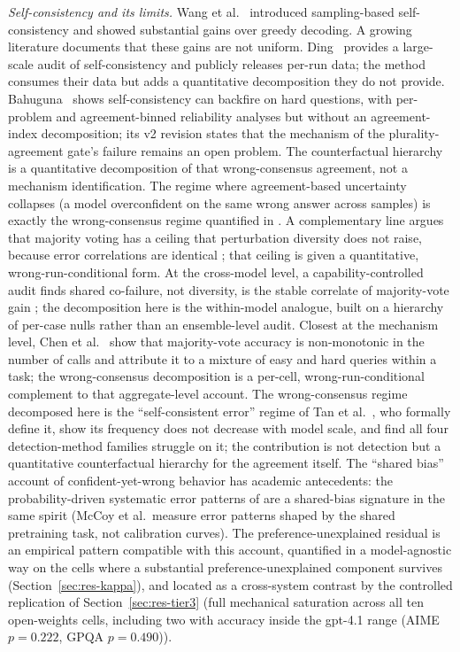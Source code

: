 \documentclass{article}
\begin{document}
\emph{Self-consistency and its limits.}
Wang et al.~\cite{wang2022selfconsistency} introduced sampling-based
self-consistency and showed substantial gains over greedy decoding. A
growing literature documents that these gains are not uniform.
Ding~\cite{ding2026auditing} provides a large-scale audit of self-consistency and publicly releases per-run data; the method consumes their data but adds a quantitative decomposition they do not provide.
Bahuguna~\cite{bahuguna2026when} shows self-consistency can
backfire on hard questions, with per-problem and agreement-binned
reliability analyses but without an agreement-index decomposition; its v2 revision states that the mechanism of the plurality-agreement gate's failure remains an open problem. The counterfactual hierarchy is a quantitative decomposition of that wrong-consensus agreement, not a mechanism identification. The regime where agreement-based uncertainty collapses (a model overconfident on the same wrong answer across samples) is exactly the wrong-consensus regime quantified in \cite{hamidieh2026}. A complementary line argues that majority voting has a ceiling that perturbation diversity does not raise, because error correlations are identical \cite{fadnavis2026}; that ceiling is given a quantitative, wrong-run-conditional form. At the cross-model level, a capability-controlled audit finds shared co-failure, not diversity, is the stable correlate of majority-vote gain \cite{kim2026}; the decomposition here is the within-model analogue, built on a hierarchy of per-case nulls rather than an ensemble-level audit. Closest at the mechanism level, Chen et al.~\cite{chen2024} show that majority-vote accuracy is non-monotonic in the number of calls and attribute it to a mixture of easy and hard queries within a task; the wrong-consensus decomposition is a per-cell, wrong-run-conditional complement to that aggregate-level account. The wrong-consensus regime decomposed here is the ``self-consistent error'' regime of Tan et al.~\cite{tan2025}, who formally define it, show its frequency does not decrease with model scale, and find all four detection-method families struggle on it; the contribution is not detection but a quantitative counterfactual hierarchy for the agreement itself. The ``shared bias'' account of
confident-yet-wrong behavior has academic antecedents: the probability-driven systematic error patterns of \cite{mccoy2024} are a shared-bias signature in the same spirit (McCoy et al.\ measure error patterns shaped by the shared pretraining task, not calibration curves). The preference-unexplained residual is an empirical pattern compatible with this account, quantified in a model-agnostic way
on the cells where a substantial
preference-unexplained component survives (Section~\ref{sec:res-kappa}),
and located as a cross-system contrast by the controlled replication of
Section~\ref{sec:res-tier3} (full mechanical saturation across
all ten open-weights cells, including two with accuracy inside the gpt-4.1 range
(AIME $p=0.222$, GPQA $p=0.490$)).
\end{document}

